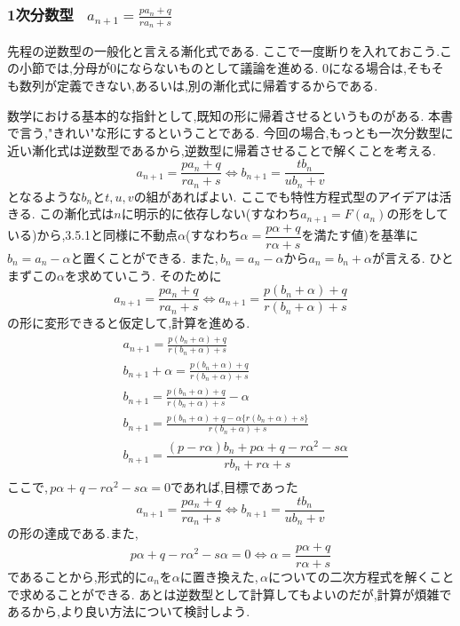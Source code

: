 
\subsubsection{1次分数型  \, $\displaystyle a_{n+1}=\frac{pa_n+q}{ra_n+s}$}
    先程の逆数型の一般化と言える漸化式である.
    ここで一度断りを入れておこう.この小節では,分母が0にならないものとして議論を進める.
    0になる場合は,そもそも数列が定義できない,あるいは,別の漸化式に帰着するからである.

    数学における基本的な指針として,既知の形に帰着させるというものがある.
    本書で言う,"きれい"な形にするということである.
    今回の場合,もっとも一次分数型に近い漸化式は逆数型であるから,逆数型に帰着させることで解くことを考える.
    \[
      a_{n+1}=\frac{pa_n+q}{ra_n+s} \Leftrightarrow b_{n+1}=\frac{tb_n}{u b_n+v} 
    \]
    となるような$b_n$と$t,u,v$の組があればよい.
    ここでも特性方程式型のアイデアは活きる.
    この漸化式は$n$に明示的に依存しない(すなわち$a_{n+1}=F(a_n)$の形をしている)から,3.5.1と同様に不動点$\alpha$(すなわち$\alpha=\dfrac{p\alpha+q}{r\alpha+s}$を満たす値)を基準に\,$b_n=a_n-\alpha$と置くことができる.
    また,\,$b_n=a_n-\alpha$から$a_n=b_n+\alpha$が言える.
    ひとまずこの$\alpha$を求めていこう.
    そのために
    \[
      a_{n+1}=\frac{pa_n+q}{ra_n+s} \Leftrightarrow a_{n+1}=\frac{p(b_n+\alpha)+q}{r(b_n+\alpha)+s}
    \]
    の形に変形できると仮定して,計算を進める.
    \begin{align*}
      &a_{n+1}=\frac{p(b_n+\alpha)+q}{r(b_n+\alpha)+s}\\
      &b_{n+1}+\alpha=\frac{p(b_n+\alpha)+q}{r(b_n+\alpha)+s}\\
      &b_{n+1}=\frac{p(b_n+\alpha)+q}{r(b_n+\alpha)+s}-\alpha\\
      &b_{n+1}=\frac{p(b_n+\alpha)+q-\alpha\{r(b_n+\alpha)+s\}}{r(b_n+\alpha)+s}\\
      &b_{n+1}=\dfrac{(p-r\alpha)b_{n}+p\alpha+q-r\alpha^{2}-s\alpha}{rb_{n}+r\alpha+s}\\
    \end{align*}
    ここで,\,$p\alpha+q-r\alpha^{2}-s\alpha=0$であれば,目標であった
    \[
      a_{n+1}=\frac{pa_n+q}{ra_n+s} \Leftrightarrow b_{n+1}=\frac{tb_n}{u b_n+v} 
    \]
    の形の達成である.また,
    \[
      p\alpha+q-r\alpha^{2}-s\alpha=0 \Leftrightarrow \alpha=\frac{p\alpha+q}{r\alpha+s}
    \]
    であることから,形式的に$a_n$を$\alpha$に置き換えた,\,$\alpha$についての二次方程式を解くことで求めることができる.
    あとは逆数型として計算してもよいのだが,計算が煩雑であるから,より良い方法について検討しよう.

